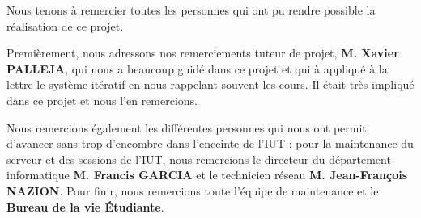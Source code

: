 Nous tenons à remercier toutes les personnes qui ont pu rendre possible la réalisation de ce projet.

Premièrement, nous adressons nos remerciements tuteur de projet, \textbf{M. Xavier PALLEJA}, qui nous a beaucoup guidé dans ce projet et qui à appliqué à la lettre le système itératif en nous rappelant souvent les cours.
Il était très impliqué dans ce projet et nous l'en remercions.

Nous remercions également les différentes personnes qui nous ont permit d'avancer sans trop d'encombre dans l'enceinte de l'IUT : pour la maintenance du serveur et des sessions de l'IUT, 
nous remercions le directeur du département informatique \textbf{M. Francis GARCIA} et le technicien réseau \textbf{M. Jean-François NAZION}.
Pour finir, nous remercions toute l'équipe de maintenance et le \textbf{Bureau de la vie Étudiante}.
